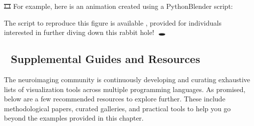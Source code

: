 \documentclass[letterpaper,10pt,english]{jupyterBook}
\begin{document}
\sphinxAtStartPar
🎞️ For example, here is an animation created using a Python\sphinxhyphen{}Blender script:



\sphinxAtStartPar
The script to reproduce this figure is available , provided for individuals interested in further diving down this rabbit hole! 🐇🕳️


\subsection{💠 Supplemental Guides and Resources}
\label{\detokenize{chapters/03/03b_visualization-tools:supplemental-guides-and-resources}}
\sphinxAtStartPar
The neuroimaging community is continuously developing and curating exhaustive lists of visualization tools across multiple programming languages. As promised, below are a few recommended resources to explore further. These include methodological papers, curated galleries, and practical tools to help you go beyond the examples provided in this chapter.
\end{document}
